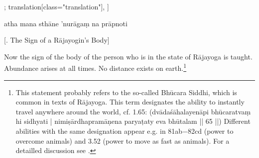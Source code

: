 \begin{alignment}[
  texts=edition[class="edition"];
  translation[class="translation"],
  ]
\begin{edition}
\begin{prose}
atha 
mana
sthāne 'nurāgaṃ na prāpnoti\dd{}
\end{prose}
  \end{edition}
  \begin{translation}
    \centerline{\textrm{\small{[.\textsuperscript{} The Sign of a Rājayogin's Body]}}}
    \label{rajabodytrans}
    \bigskip
    \begin{tlate}
      \noindent
      Now the sign of the body of the person who is in the state of Rājayoga is taught. Abundance arises at all times. No distance exists on earth.\footnote{This statement probably refers to the so-called Bhūcara Siddhi, which is common in texts of Rājayoga. This term designates the ability to instantly travel anywhere around the world, cf.  1.65: (dvādaśāhalayenāpi bhūcaratvaṃ hi sidhyati | nimiṣārdhapramāṇena paryaṭaty eva bhūtalam || 65 ||) Different abilities with the same designation appear e.g. in  81ab−82cd (power to overcome animals) and  3.52 (power to move as fast as animals). For a detailled discussion see \citeauthor[2013: 275, endnote 91]{birch2013}.}

\end{tlate}
\end{translation}
\end{alignment}
